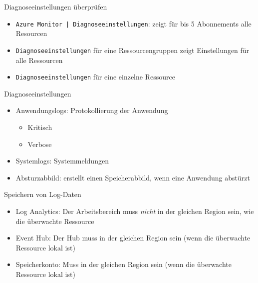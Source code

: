 

\begin{flashcard}[Definition]{Diagnoseeinstellungen überprüfen}
    \begin{itemize}
        \item \texttt{Azure Monitor | Diagnoseeinstellungen}: zeigt für bis 5 Abonnements alle Resourcen
        \item \texttt{Diagnoseeinstellungen} für eine Ressourcengruppen zeigt Einstellungen für alle Ressourcen
         \item \texttt{Diagnoseeinstellungen} für eine einzelne Ressource
    \end{itemize}
\end{flashcard}

\begin{flashcard}[Definition]{Diagnoseeinstellungen}
    \begin{itemize}
        \item Anwendungslogs: Protokollierung der Anwendung
            \begin{itemize}
                \item Kritisch
                \item Verbose
            \end{itemize}
        \item Systemlogs: Systemmeldungen
        \item Absturzabbild: erstellt einen Speicherabbild, wenn eine Anwendung abstürzt
    \end{itemize}
\end{flashcard}

\begin{flashcard}[Definition]{Speichern von Log-Daten}
    \begin{itemize}
        \item Log Analytics:\newline
            Der Arbeitsbereich muss \emph{nicht} in der gleichen Region sein, wie die überwachte Ressource
        \item Event Hub:\newline
            Der Hub muss in der gleichen Region sein (wenn die überwachte Ressource lokal ist)
        \item Speicherkonto:\newline
            Muss in der gleichen Region sein (wenn die überwachte Ressource lokal ist)
    \end{itemize}
\end{flashcard}

